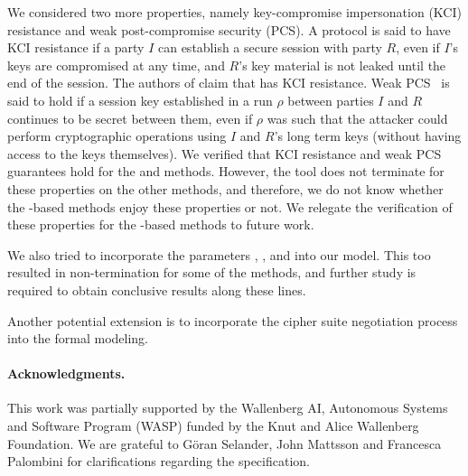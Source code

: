 \documentclass[runningheads, envcountsame, hidelinks, a4paper, x11names]{article}
\begin{document}
We considered two more properties, namely key-compromise impersonation (KCI) resistance and weak post-compromise security (PCS). A protocol is said to have KCI resistance if a party $I$ can establish a secure session with party $R$, even if $I$'s keys are compromised at any time, and $R$'s key material is not leaked until the end of the session. The authors of \mSpec{} claim that \mEdhoc{} has KCI resistance. Weak PCS~\cite{cohn2016post} is said to hold if a session key established in a run $\rho$ between parties $I$ and $R$ continues to be secret between them, even if $\rho$ was such that the attacker could perform cryptographic operations using $I$ and $R$'s long term keys (without having access to the keys themselves). We verified that KCI resistance and weak PCS guarantees hold for the \mSigSig{} and \mPskPsk{} methods.
However, the tool does not terminate for these properties on the other methods, and therefore, we do not know whether the \mStat-based methods enjoy these properties or not. We relegate the verification of these properties for the \mStat-based methods to future work. 
%

We also tried to incorporate the parameters \mCi, \mCr, and \mAD{} into our model. This too resulted in non-termination for some of the methods, and further study is required to obtain conclusive results along these lines. 

Another potential extension is to incorporate the cipher suite negotiation process into the formal modeling.\\ 
%

\paragraph{Acknowledgments.} This work was partially supported by
the Wallenberg AI, Autonomous Systems and Software Program (WASP) funded by
the Knut and Alice Wallenberg Foundation.
%
We are grateful to G\"oran Selander, John Mattsson and Francesca Palombini for
clarifications regarding the specification.
%



\end{document}
